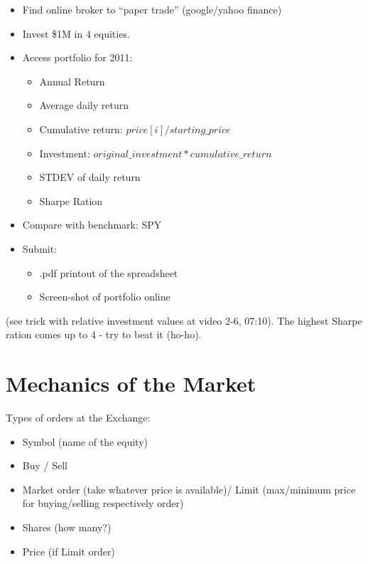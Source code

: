\documentclass{scrartcl}
\begin{document}
\begin{itemize}
\item Find online broker to ``paper trade'' (google/yahoo finance)
\item Invest \$1M in 4 equities.
\item Access portfolio for 2011:
  \begin{itemize}
  \item Annual Return
  \item Average daily return
  \item Cumulative return: $price[i]/starting\_price$ 
  \item Investment: $original\_investment * cumulative\_return$
  \item STDEV of daily return
  \item Sharpe Ration
  \end{itemize}
\item Compare with benchmark: SPY
\item Submit:
  \begin{itemize}
  \item .pdf printout of the spreadsheet
  \item Screen-shot of portfolio online
  \end{itemize}
\end{itemize}
(see trick with relative investment values at video 2-6, 07:10).
The highest Sharpe ration comes up to 4 - try to beat it (ho-ho).

\section{Mechanics of the Market}
\label{sec:MechanicsOfMarkets}
Types of orders at the Exchange:
\begin{itemize}
\item Symbol (name of the equity)
\item Buy / Sell
\item Market order (take whatever price is available)/ Limit (max/minimum price
  for buying/selling respectively order)
\item Shares (how many?)
\item Price (if Limit order)
\end{itemize}
\end{document}

